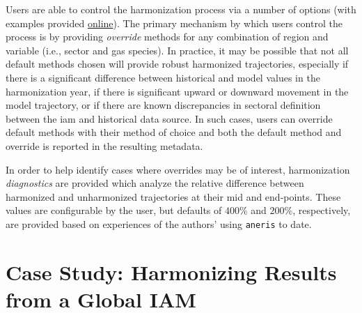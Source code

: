 \documentclass[review]{elsarticle}
\newcommand{\code}[1]{\lstinline[basicstyle=\ttfamily\color{black}]|#1|}
\begin{document}
Users are able to control the harmonization process via a number of options
(with examples provided
\href{http://mattgidden.com/aneris/config.html}{online}). The primary mechanism
by which users control the process is by providing \textit{override} methods for
any combination of region and variable (i.e., sector and gas species).  In
practice, it may be possible that not all default methods chosen will provide
robust harmonized trajectories, especially if there is a significant difference
between historical and model values in the harmonization year, if there is
significant upward or downward movement in the model trajectory, or if there are
known discrepancies in sectoral definition between the \gls{iam} and historical data
source. In such cases, users can override default methods with their method of
choice and both the default method and override is reported in the resulting
metadata.

In order to help identify cases where overrides may be of interest,
harmonization \textit{diagnostics} are provided which analyze the relative
difference between harmonized and unharmonized trajectories at their mid and
end-points. These values are configurable by the user, but defaults of $400$\%
and $200$\%, respectively, are provided based on experiences of the authors'
using \code{aneris} to date.

\section{Case Study: Harmonizing Results from a Global IAM}\label{sec:results}
\end{document}

